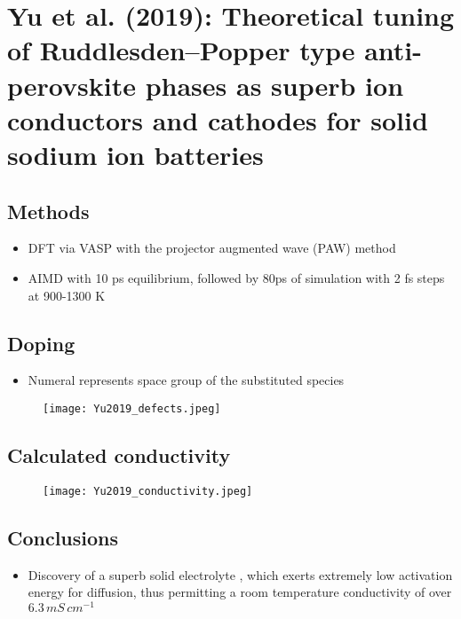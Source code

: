 \documentclass[10pt,a4paper, titlepage]{article}
\begin{document}
\section{Yu et al. (2019): Theoretical tuning of Ruddlesden–Popper type anti-perovskite phases as superb ion conductors and cathodes for solid sodium ion batteries}

\subsection{Methods}

\begin{itemize}
  \item DFT via VASP with the projector augmented wave (PAW) method
  \item AIMD with 10 ps equilibrium, followed by 80ps of simulation with 2 fs steps at 900-1300 K
\end{itemize}

\subsection{Doping}

\begin{itemize}
  \item Numeral represents space group of the substituted species
\end{itemize}

\begin{figure}[H]
\centering
\texttt{[image: Yu2019\_defects.jpeg]}
\end{figure}

\subsection{Calculated conductivity}

\begin{figure}[H]
\centering
\texttt{[image: Yu2019\_conductivity.jpeg]}
\end{figure}

\subsection{Conclusions}

\begin{itemize}
  \item Discovery of a superb solid electrolyte , which exerts extremely low activation energy for  diffusion, thus permitting a room temperature  conductivity of over $6.3 \, mS \, cm^{-1}$
\end{itemize}
\end{document}
